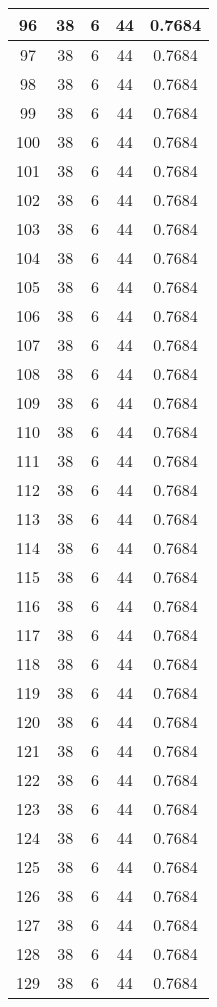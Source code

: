 \documentclass[letterpaper, 12pt]{article}
\begin{document}
\begin{longtable}{|c|c|c|c|c|}
\hline
96 & 38 & 6 & 44 & 0.7684 \\
\hline
97 & 38 & 6 & 44 & 0.7684 \\
\hline
98 & 38 & 6 & 44 & 0.7684 \\
\hline
99 & 38 & 6 & 44 & 0.7684 \\
\hline
100 & 38 & 6 & 44 & 0.7684 \\
\hline
101 & 38 & 6 & 44 & 0.7684 \\
\hline
102 & 38 & 6 & 44 & 0.7684 \\
\hline
103 & 38 & 6 & 44 & 0.7684 \\
\hline
104 & 38 & 6 & 44 & 0.7684 \\
\hline
105 & 38 & 6 & 44 & 0.7684 \\
\hline
106 & 38 & 6 & 44 & 0.7684 \\
\hline
107 & 38 & 6 & 44 & 0.7684 \\
\hline
108 & 38 & 6 & 44 & 0.7684 \\
\hline
109 & 38 & 6 & 44 & 0.7684 \\
\hline
110 & 38 & 6 & 44 & 0.7684 \\
\hline
111 & 38 & 6 & 44 & 0.7684 \\
\hline
112 & 38 & 6 & 44 & 0.7684 \\
\hline
113 & 38 & 6 & 44 & 0.7684 \\
\hline
114 & 38 & 6 & 44 & 0.7684 \\
\hline
115 & 38 & 6 & 44 & 0.7684 \\
\hline
116 & 38 & 6 & 44 & 0.7684 \\
\hline
117 & 38 & 6 & 44 & 0.7684 \\
\hline
118 & 38 & 6 & 44 & 0.7684 \\
\hline
119 & 38 & 6 & 44 & 0.7684 \\
\hline
120 & 38 & 6 & 44 & 0.7684 \\
\hline
121 & 38 & 6 & 44 & 0.7684 \\
\hline
122 & 38 & 6 & 44 & 0.7684 \\
\hline
123 & 38 & 6 & 44 & 0.7684 \\
\hline
124 & 38 & 6 & 44 & 0.7684 \\
\hline
125 & 38 & 6 & 44 & 0.7684 \\
\hline
126 & 38 & 6 & 44 & 0.7684 \\
\hline
127 & 38 & 6 & 44 & 0.7684 \\
\hline
128 & 38 & 6 & 44 & 0.7684 \\
\hline
129 & 38 & 6 & 44 & 0.7684 \\

\end{longtable}
\end{document}
